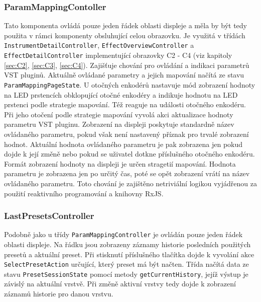 \documentclass[thesis=M,czech]{FITthesis}[2019/03/06]
\begin{document}
			\subsubsection{ParamMappingContoller}
				Tato komponenta ovládá pouze jeden řádek oblasti displeje a měla by být tedy použita v rámci komponenty obsluhující celou obrazovku.
				Je využitá v třídách \texttt{Instrument\-Detail\-Controller}, \texttt{Effect\-Overview\-Controller} a \texttt{Effect\-Detail\-Controller} implementující obrazovky C2 - C4 (viz kapitoly \ref{sec:C2}, \ref{sec:C3}, \ref{sec:C4}). Zajišťuje chování pro ovládání a indikaci parametrů VST pluginů. Aktuálně ovládané parametry a jejich mapování načítá ze stavu \texttt{Param\-Mapping\-Page\-State}.
				U otočných enkodérů nastavuje mód zobrazení hodnoty na LED prstencích obklopující otočné enkodéry a indikuje hodnotu na LED prstenci podle strategie mapování. Též
				reaguje na události otočného enkodéru. Při jeho otočení podle strategie mapování vyvolá akci aktualizace hodnoty parametru VST pluginu.
				Zobrazení na displeji poskytuje standardně název ovládaného parametru, pokud však není nastavený příznak pro trvalé 
				zobrazení hodnot.
				Aktuální hodnota ovládaného parametru je pak zobrazena jen pokud dojde k její změně nebo pokud se uživatel dotkne příslušného otočného enkodéru.
				Formát zobrazení hodnoty na displeji je určen stragetií mapování.
				Hodnota parametru je zobrazena jen po určitý čas, poté se opět zobrazení vrátí na název ovládaného parametru. 
				Toto chování je zajištěno netriviální logikou vyjádřenou za použití reaktivního programování a knihovny RxJS.
				
			\subsubsection{LastPresetsController}
				Podobně jako u třídy \texttt{Param\-Mapping\-Controller} je ovládán pouze jeden řádek oblasti displeje. Na řádku jsou zobrazeny
				záznamy historie posledních použitých presetů a aktuální preset. Při stisknutí příslušného tlačítka dojde k vyvolání 
				akce \texttt{Select\-Preset\-Action} určující, který preset má být načten. Třída načítá data ze stavu \texttt{Preset\-Session\-State}
				pomocí metody \texttt{get\-Current\-History}, jejíž výstup je závislý na aktuální vrstvě. Při změně aktivní vrstvy tedy dojde
				k zobrazení záznamů historie pro danou vrstvu.
							
\end{document}
